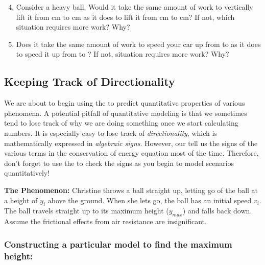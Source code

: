 \begin{enumerate}\setcounter{enumi}{3}	
	\item Consider a heavy ball. Would it take the same amount of work to vertically lift it from \unit[25]{cm} to \unit[30]{cm} as it does to lift it from \unit[30]{cm} to \unit[35]{cm}? If not, which situation requires more work? Why?
	
	\item Does it take the same amount of work to speed your car up from  to  as it does to speed it up from  to ? If not, situation requires more work? Why?
\end{enumerate}

\subsection{Keeping Track of Directionality}
\label{act2.2.1b}

We are about to begin using the \EnergyInteractionModel{} to predict quantitative properties of various phenomena. A potential pitfall of quantitative modeling is that we sometimes tend to lose track of why we are doing something once we start calculating numbers. It is especially easy to lose track of \emph{directionality}, which is mathematically expressed in \emph{algebraic signs}. However, our \EnergyDiagrams{} tell us the signs of the various terms in the conservation of energy equation most of the time. Therefore, don't forget to use the \EnergyDiagrams{} to check the signs as you begin to model scenarios quantitatively!

\noindent\textbf{The Phenomenon:} Christine throws a ball straight up, letting go of the ball at a height of $y_i$ above the ground. When she lets go, the ball has an initial speed $v_i$. The ball travels straight up to its maximum height ($y_{max}$) and falls back down. Assume the frictional effects from air resistance are insignificant.

\subsubsection*{Constructing a particular model to find the maximum height:}

